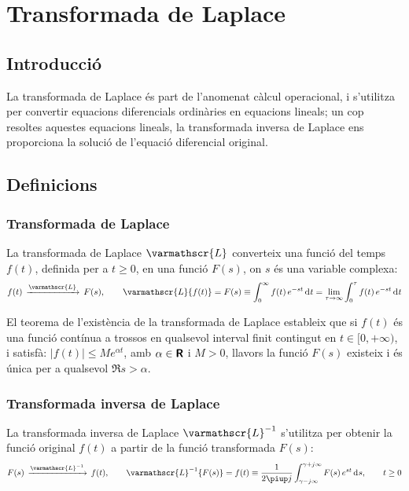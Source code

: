 
\chapter{Transformada de Laplace}\label{sec:ch-laplace}

\section{Introducció}
La transformada de Laplace és part de l'anomenat càlcul operacional,
i s'utilitza per convertir equacions diferencials ordinàries en
equacions lineals; un cop resoltes aquestes equacions lineals, la
transformada inversa de Laplace ens proporciona la solució de
l'equació diferencial original.

\section{Definicions}

\subsection{Transformada de Laplace}

La transformada de Laplace $\varmathscr{L}$  converteix una funció del
temps $f(t)$, definida per a $t\geq 0$, en una funció $F(s)$, on $s$
és una variable complexa:
\begin{equation}
	f(t)\,\xrightarrow{\varmathscr{L}}\,F(s), \qquad
    \varmathscr{L}\{f(t)\} = F(s) \equiv \int_0^\infty f(t) \,e^{-s t} \diff t =
    \lim_{\tau\to\infty} \int_0^\tau f(t) \,e^{-s t} \diff t \label{eq:transf_laplace}
\end{equation}

El teorema de l'existència de la transformada de Laplace estableix
que si $f(t)$ és una funció contínua a trossos en qualsevol
interval finit contingut en $t \in [0,+\infty)$, i satisfà: $|f(t)| \leq M
e^{\alpha t}$, amb $\alpha \in {\ensuremath{\boldsymbol{\mathsf{R}}}}$ i $M > 0$,  llavors la
funció $F(s)$ existeix i és única per a
qualsevol $\Re s > \alpha$.

\subsection{Transformada inversa de Laplace}

La transformada inversa de Laplace $\varmathscr{L}^{-1}$ s'utilitza per
obtenir la funció original $f(t)$ a partir de la funció
transformada $F(s)$:
\begin{equation}
	F(s)\,\xrightarrow{\varmathscr{L}^{-1}}\,f(t), \qquad
    \varmathscr{L}^{-1}\{F(s)\} = f(t) \equiv \frac{1}{2 \piup j }
    \int_{\gamma-j \infty}^{\gamma+j \infty} F(s)\, e^{s t} \diff s,
    \qquad t\geq 0 \label{eq:transf_inv_laplace}
\end{equation}

